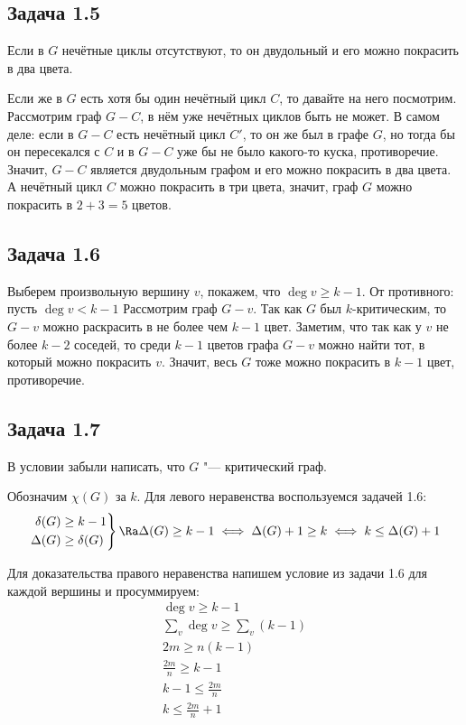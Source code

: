 \subsection{Задача 1.5}
	Если в $G$ нечётные циклы отсутствуют, то он двудольный и его можно покрасить в два цвета.

	Если же в $G$ есть хотя бы один нечётный цикл $C$, то давайте на него посмотрим.
	Рассмотрим граф $G - C$, в нём уже нечётных циклов быть не может.
	В самом деле: если в $G - C$ есть нечётный цикл $C'$, то он же был в графе $G$,
	но тогда бы он пересекался с $C$ и в $G-C$ уже бы не было какого-то куска, противоречие.
	Значит, $G-C$ является двудольным графом и его можно покрасить в два цвета.
	А нечётный цикл $C$ можно покрасить в три цвета, значит, граф $G$ можно покрасить
	в $2+3=5$ цветов.

\subsection{Задача 1.6}	
	Выберем произвольную вершину $v$, покажем, что $\deg v \ge k - 1$.
	От противного: пусть $\deg v < k - 1$
	Рассмотрим граф $G-v$.
	Так как $G$ был $k$-критическим, то $G-v$ можно раскрасить в не более чем $k-1$ цвет.
	Заметим, что так как у $v$ не более $k-2$ соседей, то среди $k-1$ цветов графа $G-v$ можно найти тот,
 	в который можно покрасить $v$.
 	Значит, весь $G$ тоже можно покрасить в $k-1$ цвет, противоречие.

\subsection{Задача 1.7}
	\begin{Rem}
		В условии забыли написать, что $G$ "--- критический граф.
	\end{Rem}
	Обозначим $\chi(G)$ за $k$.
	Для левого неравенства воспользуемся задачей 1.6:
	\begin{gather*}
		\left.
			\begin{aligned}
				\delta(G) &\ge k - 1 \\
				\Delta(G) &\ge \delta(G)
			\end{aligned}
		\right\}
			\Ra
			\Delta(G) \ge k - 1
			\iff
			\Delta(G) + 1 \ge k
			\iff
			k \le \Delta(G) + 1
	\end{gather*}

	Для доказательства правого неравенства напишем условие из задачи 1.6 для каждой вершины и просуммируем:
	\begin{gather*}
		\deg v \ge k - 1 \\
		\sum_v \deg v \ge \sum_v (k - 1) \\
		2m \ge n(k - 1) \\
		\frac{2m}{n} \ge k - 1 \\
		k - 1 \le \frac{2m}{n} \\
		k \le \frac{2m}{n} + 1 \\
	\end{gather*}

